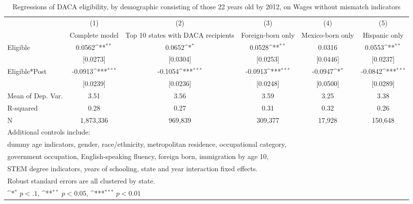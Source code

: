 \begin{table}[htbp]\centering
\def\sym#1{\ifmmode^{#1}\else\(^{#1}\)\fi}
\caption{Regressions of DACA eligibility, by demographic consisting of those 22 years old by 2012, on Wages without mismatch indicators}
\begin{tabular}{l*{5}{c}}
\toprule
                    &\multicolumn{1}{c}{(1)}         &\multicolumn{1}{c}{(2)}         &\multicolumn{1}{c}{(3)}         &\multicolumn{1}{c}{(4)}         &\multicolumn{1}{c}{(5)}         \\
                    &Complete model         &Top 10 states with DACA recipients         &Foreign-born only         &Mexico-born only         &Hispanic only         \\
\midrule
Eligible            &      0.0562\sym{**} &      0.0652\sym{*}  &      0.0528\sym{**} &      0.0316         &      0.0553\sym{**} \\
                    &    [0.0273]         &    [0.0304]         &    [0.0253]         &    [0.0446]         &    [0.0237]         \\
\addlinespace
Eligible*Post       &     -0.0913\sym{***}&     -0.1054\sym{***}&     -0.0913\sym{***}&     -0.0947\sym{*}  &     -0.0842\sym{***}\\
                    &    [0.0239]         &    [0.0236]         &    [0.0248]         &    [0.0500]         &    [0.0289]         \\
\midrule
Mean of Dep. Var.   &        3.51         &        3.56         &        3.59         &        3.25         &        3.38         \\
R-squared           &        0.28         &        0.27         &        0.31         &        0.32         &        0.26         \\
N                   &   1,873,336         &     969,839         &     309,377         &      17,928         &     150,648         \\
\bottomrule
\multicolumn{6}{l}{\footnotesize Additional controls include:}\\
\multicolumn{6}{l}{\footnotesize dummy age indicators, gender, race/ethnicity, metropolitan residence, occupational category,}\\
\multicolumn{6}{l}{\footnotesize government occupation, English-speaking fluency, foreign born, immigration by age 10,}\\
\multicolumn{6}{l}{\footnotesize STEM degree indicators, years of schooling, state and year interaction fixed effects.}\\
\multicolumn{6}{l}{\footnotesize Robust standard errors are all clustered by state.}\\
\multicolumn{6}{l}{\footnotesize \sym{*} \(p<.1\), \sym{**} \(p<0.05\), \sym{***} \(p<0.01\)}\\
\end{tabular}
\end{table}
